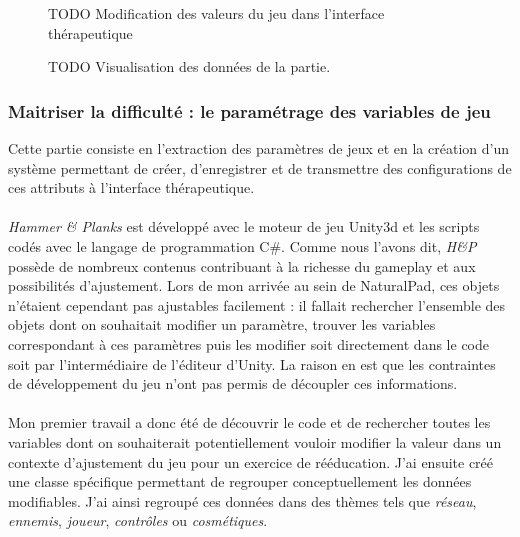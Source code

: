 \begin{figure}[htbp]
	\centering
	\caption{TODO Modification des valeurs du jeu dans l'interface thérapeutique}
	\label{interface_therapeutique_01}
\end{figure}

\begin{figure}[htbp]
	\centering
	\caption{TODO Visualisation des données de la partie.}
	\label{interface_therapeutique_02}
\end{figure}

	\subsubsection*{Maitriser la difficulté : le paramétrage des variables de jeu}
Cette partie consiste en l'extraction des paramètres de jeux et en la création d'un système permettant de créer, d'enregistrer et de transmettre des configurations de ces attributs à l'interface thérapeutique.

\paragraph{}
\emph{Hammer \& Planks} est développé avec le moteur de jeu Unity3d et les scripts codés avec le langage de programmation C\#. Comme nous l'avons dit, \emph{H\&P} possède de nombreux contenus contribuant à la richesse du gameplay et aux possibilités d'ajustement. Lors de mon arrivée au sein de NaturalPad, ces objets n'étaient cependant pas ajustables facilement : il fallait rechercher l'ensemble des objets dont on souhaitait modifier un paramètre, trouver les variables correspondant à ces paramètres puis les modifier soit directement dans le code soit par l'intermédiaire de l'éditeur d'Unity. La raison en est que les contraintes de développement du jeu n'ont pas permis de découpler ces informations.

\paragraph{}
Mon premier travail a donc été de découvrir le code et de rechercher toutes les variables dont on souhaiterait potentiellement vouloir modifier la valeur dans un contexte d'ajustement du jeu pour un exercice de rééducation. J'ai ensuite créé une classe spécifique permettant de regrouper conceptuellement les données modifiables. J'ai ainsi regroupé ces données dans des thèmes tels que \emph{réseau}, \emph{ennemis}, \emph{joueur}, \emph{contrôles} ou \emph{cosmétiques}.

